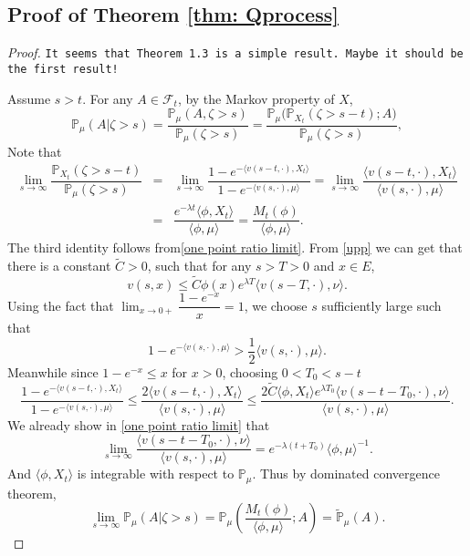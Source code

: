 \documentclass[12pt,a4paper]{amsart}
\numberwithin{equation}{section}
\theoremstyle{plain}
\theoremstyle{definition}
\theoremstyle{remark}
\begin{document}
\subsection{Proof of Theorem \ref{thm: Qprocess}}
\begin{proof} 
	
	{\tt It seems that Theorem 1.3 is a simple result. Maybe it should be the first result!} 
	
Assume $s>t$.  For any $A\in\mathscr F_t$, by the Markov property of $X$,
\[
\mathbb P_\mu(A|\zeta>s)=\dfrac{\mathbb P_\mu(A, \zeta>s)}{\mathbb P_\mu(\zeta>s)}=\dfrac{\mathbb P_\mu\big(\mathbb P_{X_t}(\zeta>s-t);A\big)}{\mathbb P_\mu(\zeta>s)},
\]
 Note that
\begin{eqnarray*}
\lim_{s\rightarrow\infty}\dfrac{\mathbb P_{X_t}(\zeta>s-t)}{\mathbb P_\mu(\zeta>s)}
&=&\lim_{s\rightarrow\infty}\dfrac{1-e^{-\langle v(s-t,\cdot),X_t\rangle }}{1-e^{-\langle v(s,\cdot),\mu\rangle }}
=\lim_{s\rightarrow\infty}\dfrac{\langle v(s-t,\cdot),X_t\rangle }{\langle v(s,\cdot),\mu\rangle }\\
&=& \dfrac{e^{-\lambda t}\langle \phi, X_t\rangle }{\langle \phi,\mu\rangle }=\dfrac{M_t(\phi)}{\langle \phi,\mu\rangle }.
\end{eqnarray*}
The third identity follows from\eqref{one point ratio limit}.  From \eqref{upp} we can get that there is a constant $\widetilde C>0$, such that for any $s>T>0$ and $x\in E$,
\[
v(s,x)\leq \widetilde C\phi(x)e^{\lambda T}\langle v(s-T,\cdot),\nu\rangle .
\]
Using the fact that $\lim_{x\rightarrow 0+}\dfrac{1-e^{-x}}{x}=1$, we choose $s$ sufficiently large such that
\[
1-e^{-\langle v(s,\cdot),\mu\rangle }>\frac{1}{2}\langle v(s,\cdot),\mu\rangle .
\]
Meanwhile since $1-e^{-x}\leq x$ for $x>0$, choosing $0<T_0<s-t$
\[
\dfrac{1-e^{-\langle v(s-t,\cdot),X_t\rangle }}{1-e^{-\langle v(s,\cdot),\mu\rangle }}
\leq \dfrac{2\langle v(s-t,\cdot),X_t\rangle }{\langle v(s,\cdot),\mu\rangle }\leq \dfrac{2\widetilde C\langle \phi,X_t\rangle e^{\lambda T_0}\langle v(s-t-T_0,\cdot),\nu\rangle }{\langle v(s,\cdot),\mu\rangle }.
\]
We already show in \eqref{one point ratio limit} that
\[
\lim_{s\rightarrow\infty}\dfrac{\langle v(s-t-T_0,\cdot),\nu\rangle }{\langle v(s,\cdot),\mu\rangle }
=e^{-\lambda(t+T_0)}\langle \phi,\mu\rangle ^{-1}.
\]
And $\langle \phi,X_t\rangle $ is integrable with respect to $\mathbb P_\mu$.  Thus by dominated convergence theorem,
\[
\lim_{s\rightarrow\infty}\mathbb P_\mu(A|\zeta>s)=\mathbb P_\mu\left(\frac{M_t(\phi)}{\langle\phi,\mu\rangle };A\right)=\widetilde{\mathbb P}_\mu(A).
\]
\end{proof}
\end{document}
